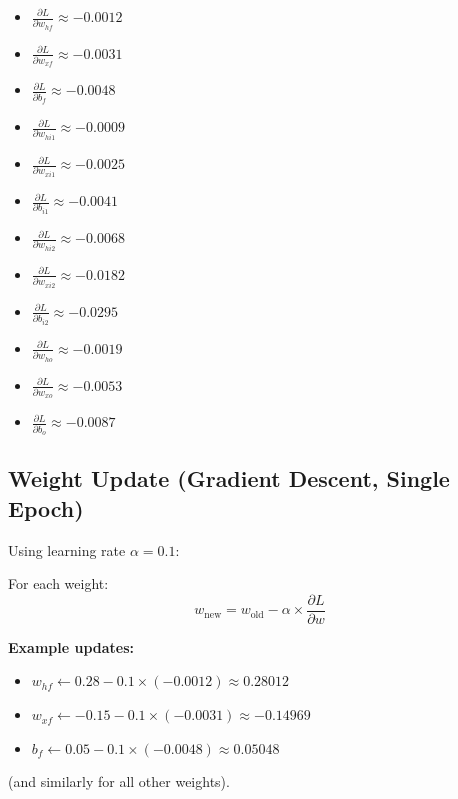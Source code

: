 \documentclass[12pt]{article}
\begin{document}
\begin{itemize}[leftmargin=*]
    \item $\frac{\partial L}{\partial w_{hf}} \approx -0.0012$
    \item $\frac{\partial L}{\partial w_{xf}} \approx -0.0031$
    \item $\frac{\partial L}{\partial b_f} \approx -0.0048$
    \item $\frac{\partial L}{\partial w_{hi1}} \approx -0.0009$
    \item $\frac{\partial L}{\partial w_{xi1}} \approx -0.0025$
    \item $\frac{\partial L}{\partial b_{i1}} \approx -0.0041$
    \item $\frac{\partial L}{\partial w_{hi2}} \approx -0.0068$
    \item $\frac{\partial L}{\partial w_{xi2}} \approx -0.0182$
    \item $\frac{\partial L}{\partial b_{i2}} \approx -0.0295$
    \item $\frac{\partial L}{\partial w_{ho}} \approx -0.0019$
    \item $\frac{\partial L}{\partial w_{xo}} \approx -0.0053$
    \item $\frac{\partial L}{\partial b_o} \approx -0.0087$
\end{itemize}

\subsection*{Weight Update (Gradient Descent, Single Epoch)}

Using learning rate $\alpha = 0.1$:

For each weight:
\begin{equation*}
w_{\text{new}} = w_{\text{old}} - \alpha \times \frac{\partial L}{\partial w}
\end{equation*}

\textbf{Example updates:}

\begin{itemize}[leftmargin=*]
    \item $w_{hf} \leftarrow 0.28 - 0.1 \times (-0.0012) \approx 0.28012$
    \item $w_{xf} \leftarrow -0.15 - 0.1 \times (-0.0031) \approx -0.14969$
    \item $b_f \leftarrow 0.05 - 0.1 \times (-0.0048) \approx 0.05048$
\end{itemize}

(and similarly for all other weights).
\end{document}
